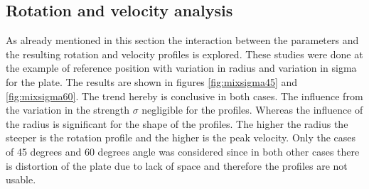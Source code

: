 \documentclass[12pt]{scrreprt}
\begin{document}
\subsection{Rotation and velocity analysis}
As already mentioned in this section the interaction between the parameters and the resulting rotation and velocity profiles is explored. These studies were done at the example of reference position with variation in radius and variation in sigma for the plate. The results are shown in figures \ref{fig:mixsigma45} and \ref{fig:mixsigma60}. The trend hereby is conclusive in both cases. The influence from the variation in the strength $\sigma$ negligible for the profiles. Whereas the influence of the radius is significant for the shape of the profiles. The higher the radius the steeper is the rotation profile and the higher is the peak velocity. Only the cases of 45 degrees and 60 degrees angle was considered since in both other cases there is distortion of the plate due to lack of space and therefore the profiles are not usable.
\end{document}
